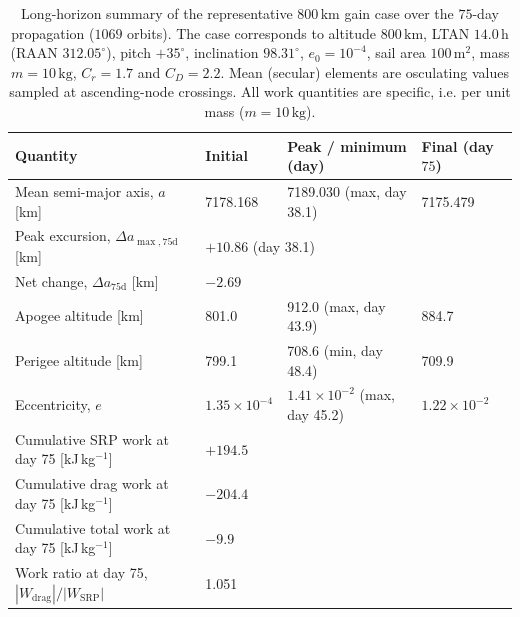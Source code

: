 \begin{table}[htbp]
\centering
\caption{Long-horizon summary of the representative \(800\,\mathrm{km}\) gain case over the \(75\)-day propagation (\(1069\) orbits). The case corresponds to altitude \(800\,\mathrm{km}\), LTAN \(14.0\,\mathrm{h}\) (RAAN \(312.05^\circ\)), pitch \(+35^\circ\), inclination \(98.31^\circ\), \(e_0=10^{-4}\), sail area \(100\,\mathrm{m^2}\), mass \(m=10\,\mathrm{kg}\), \(C_r=1.7\) and \(C_D=2.2\). Mean (secular) elements are osculating values sampled at ascending-node crossings. All work quantities are specific, i.e. per unit mass (\(m=10\,\mathrm{kg}\)).}
\label{tab:gaincase_longhorizon_summary}
\small
\begin{tabular}{p{4.9cm} p{1.8cm} p{3.2cm} p{1.8cm}}
\toprule
Quantity & Initial & Peak / minimum (day) & Final (day \(75\)) \\
\midrule
Mean semi-major axis, \(a\) [km]
& 7178.168
& 7189.030 (max, day 38.1)
& 7175.479 \\

Peak excursion, \(\Delta a_{\max,75\mathrm{d}}\) [km]
& \multicolumn{3}{l}{\(+10.86\) (day 38.1)} \\

Net change, \(\Delta a_{75\mathrm{d}}\) [km]
& \multicolumn{3}{l}{\(-2.69\)} \\

Apogee altitude [km]
& 801.0
& 912.0 (max, day 43.9)
& 884.7 \\

Perigee altitude [km]
& 799.1
& 708.6 (min, day 48.4)
& 709.9 \\

Eccentricity, \(e\)
& \(1.35\times10^{-4}\)
& \(1.41\times10^{-2}\) (max, day 45.2)
& \(1.22\times10^{-2}\) \\

Cumulative SRP work at day 75 [kJ\,kg\(^{-1}\)]
& \multicolumn{3}{l}{\(+194.5\)} \\

Cumulative drag work at day 75 [kJ\,kg\(^{-1}\)]
& \multicolumn{3}{l}{\(-204.4\)} \\

Cumulative total work at day 75 [kJ\,kg\(^{-1}\)]
& \multicolumn{3}{l}{\(-9.9\)} \\

Work ratio at day 75, \(\left|W_{\mathrm{drag}}\right|/\left|W_{\mathrm{SRP}}\right|\)
& \multicolumn{3}{l}{1.051} \\
\bottomrule
\end{tabular}
\end{table}

